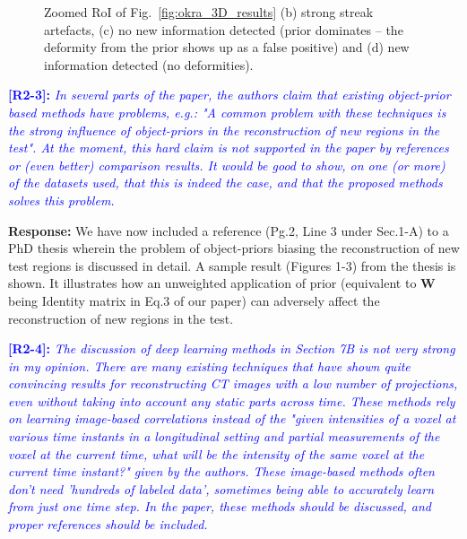 \documentclass[11pt]{article}
\begin{document}
\begin{figure}[p]
\caption[Zoomed results of Okra dataset]{Zoomed RoI of Fig.~\ref{fig:okra_3D_results} (b) strong streak artefacts, %
  (c) no new  information detected (prior dominates -- the deformity from the prior
  shows up as a false positive) and (d) new information detected (no deformities).}
\label{fig:okra_zoomed_3D_results}
\end{figure}

\vspace{0.5cm}\textcolor{blue}{\textbf{[R2-3]:} \textit{In several parts of the
    paper, the authors claim that existing object-prior based methods
    have problems, e.g.: "A common problem with these techniques is
    the strong influence of object-priors in the reconstruction of new
    regions in the test". At the moment, this hard claim is not
    supported in the paper by references or (even better) comparison
    results. It would be good to show, on one (or more) of the
    datasets used, that this is indeed the case, and that the proposed
    methods solves this problem.}}

\textbf{Response:} We have now included a reference (Pg.2, Line 3
under Sec.1-A) to a PhD thesis wherein the problem of object-priors
biasing the reconstruction of new test regions is discussed in detail.
A sample result (Figures 1-3) from the thesis is shown. It
illustrates how an unweighted application of prior (equivalent to $\boldsymbol{W}$ being Identity matrix in Eq.3 of our paper) can adversely
affect the reconstruction of new regions in the test.



\vspace{0.5cm}\textcolor{blue}{\textbf{[R2-4]:} \textit{The discussion of deep learning methods in Section 7B is not very strong in my opinion. There are many existing techniques that have shown quite convincing results for reconstructing CT images with a low number of projections, even without taking into account any static parts across time. These methods rely on learning image-based correlations instead of the "given intensities of a voxel at various time instants in a longitudinal setting and partial measurements of the voxel at the current time, what will be the intensity of the same voxel at the current time instant?" given by the authors. These image-based methods often don't need 'hundreds of labeled data', sometimes being able to accurately learn from just one time step. In the paper, these methods should be discussed, and proper references should be included.}}\\
\end{document}
